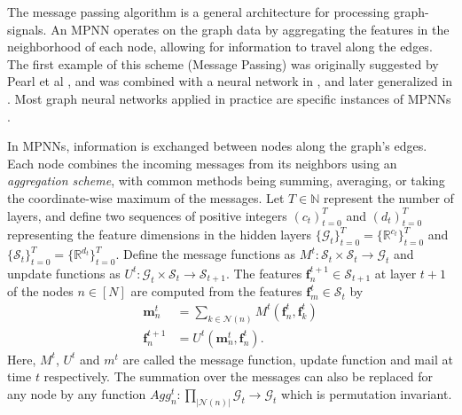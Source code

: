 \documentclass{article}
\theoremstyle{plain}
\theoremstyle{definition}
\theoremstyle{remark}
\newcommand{\ron}[1]{{{\textcolor{red}{\textbf{[Ron:} {#1}\textbf{]}}}}}
\begin{document}

The message passing algorithm is a general architecture for processing graph-signals. An MPNN operates on the graph data by aggregating the features in the neighborhood of each node, allowing for information to travel along the edges. The first example of this scheme (Message Passing) was originally suggested by Pearl et al \cite{pearl1982belief},  and was combined with a neural network in \cite{duvenaud2015convolutional}, and later generalized in \cite{gilmer2017neural}. Most graph neural networks applied in practice are specific instances of MPNNs \cite{MPNN,GCN,GAT}. %

In MPNNs, information is exchanged between nodes along the graph's edges. Each node combines the incoming messages from its neighbors using an \emph{aggregation scheme}, with common methods being summing, averaging, or taking the coordinate-wise maximum of the messages.
Let $T \in \mathbb{N}$ represent the number of layers, and define two sequences of positive integers $(c_t)_{t=0}^T$ and $(d_t)_{t=0}^T$ representing the feature dimensions in the hidden layers $\{\mathcal{G}_t\}_{t=0}^T = \{\mathbb{R}^{c_t}\}_{t=0}^T$ and  $\{\mathcal{S}_t\}_{t=0}^T = \{\mathbb{R}^{d_t}\}_{t=0}^T$. Define the message functions as  $M^t : \mathcal{S}_t \times \mathcal{S}_t \rightarrow \mathcal{G}_t$  and unpdate functions as $U^t: \mathcal{G}_t \times \mathcal{S}_t \rightarrow \mathcal{S}_{t+1}$.
The features $\mathbf{f}_n^{t+1} \in \mathcal{S}_{t+1}$ at layer $t+1$ of the nodes $n\in[N]$ are computed from the features $\mathbf{f}_m^t  \in \mathcal{S}_t$ by 
\begin{align*}
    \mathbf{m}^{t}_n &= \underset{k\in \mathcal{N}(n)}{\sum}{M^t(\mathbf{f}^t_n,\mathbf{f}^t_k)}\\
    \mathbf{f}^{t+1}_n &= U^t(\mathbf{m}^t_n, \mathbf{f}^t_n).
\end{align*}
Here, $M^t$, $U^t$ and $m^t$ are called the message function, update function and mail at time $t$ respectively.  The summation over the messages can also be replaced for any node by any function $Agg_n^t: \prod_{|\mathcal{N}(n)|} \mathcal{G}_t \rightarrow \mathcal{G}_t$
which is permutation invariant. 
\end{document}
